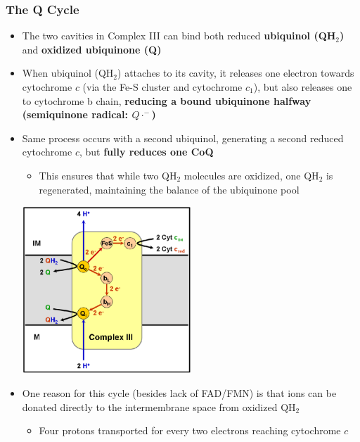 \documentclass[10pt]{article}
\newcommand{\proton}{\text{H$^+$}}
\begin{document}
\subsubsection*{The Q Cycle}
\begin{itemize}
	\item The two cavities in Complex III can bind both reduced \textbf{ubiquinol (QH$_2$)} and \textbf{oxidized ubiquinone (Q)}
	\item When ubiquinol (QH$_2$) attaches to its cavity, it releases one electron towards cytochrome $c$ (via the Fe-S cluster and cytochrome $c_1$), but also releases one to cytochrome b chain, \textbf{reducing a bound ubiquinone halfway (semiquinone radical: $Q \cdot^-$)}
	\item Same process occurs with a second ubiquinol, generating a second reduced cytochrome $c$, but \textbf{fully reduces one CoQ}
	\begin{itemize}
        \item This ensures that while two QH$_2$ molecules are oxidized, one QH$_2$ is regenerated, maintaining the balance of the ubiquinone pool
    \end{itemize}
    \begin{center} 
        \includegraphics*[width=0.5\textwidth]{L2_14.png} 
    \end{center}
    \item One reason for this cycle (besides lack of FAD/FMN) is that \proton ions can be donated directly to the intermembrane space from oxidized QH$_2$
    \begin{itemize}
        \item Four protons transported for every two electrons reaching cytochrome $c$
    \end{itemize}
\end{itemize}
\end{document}
